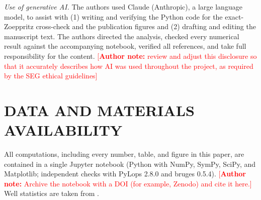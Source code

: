 \documentclass[11pt]{article}
\newcommand{\authornote}[1]{\textcolor{red}{[\textbf{Author note:} #1]}}
\begin{document}
\textit{Use of generative AI.} The authors used Claude (Anthropic), a large language model, to assist with (1) writing and verifying the Python code for the exact-Zoeppritz cross-check and the publication figures and (2) drafting and editing the manuscript text. The authors directed the analysis, checked every numerical result against the accompanying notebook, verified all references, and take full responsibility for the content. \authornote{review and adjust this disclosure so that it accurately describes how AI was used throughout the project, as required by the SEG ethical guidelines}

\section*{DATA AND MATERIALS AVAILABILITY}
All computations, including every number, table, and figure in this paper, are contained in a single Jupyter notebook (Python with NumPy, SymPy, SciPy, and Matplotlib; independent checks with PyLops 2.8.0 and bruges 0.5.4). \authornote{Archive the notebook with a DOI (for example, Zenodo) and cite it here.} Well statistics are taken from \citet{hema2027}.
\end{document}

